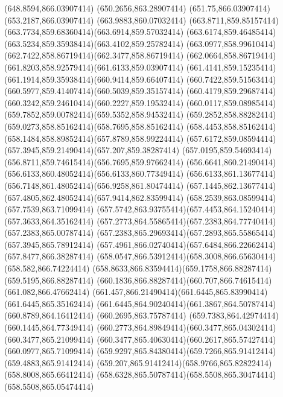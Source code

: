 {{	\lineto(648.8594,866.03907414)
	\lineto(650.2656,863.28907414)
	\lineto(651.75,866.03907414)
	\lineto(653.2187,866.03907414)
	\closepath
	\moveto(663.9883,860.07032414)
	\curveto(663.8711,859.85157414)(663.7734,859.68360414)(663.6914,859.57032414)
	\curveto(663.6174,859.46485414)(663.5234,859.35938414)(663.4102,859.25782414)
	\curveto(663.0977,858.99610414)(662.7422,858.86719414)(662.3477,858.86719414)
	\curveto(662.0664,858.86719414)(661.8203,858.92579414)(661.6133,859.03907414)
	\curveto(661.4141,859.15235414)(661.1914,859.35938414)(660.9414,859.66407414)
	\curveto(660.7422,859.51563414)(660.5977,859.41407414)(660.5039,859.35157414)
	\curveto(660.4179,859.29687414)(660.3242,859.24610414)(660.2227,859.19532414)
	\curveto(660.0117,859.08985414)(659.7852,859.00782414)(659.5352,858.94532414)
	\curveto(659.2852,858.88282414)(659.0273,858.85162414)(658.7695,858.85162414)
	\curveto(658.4453,858.85162414)(658.1484,858.89852414)(657.8789,858.99224414)
	\curveto(657.6172,859.08594414)(657.3945,859.21490414)(657.207,859.38287414)
	\curveto(657.0195,859.54693414)(656.8711,859.74615414)(656.7695,859.97662414)
	\curveto(656.6641,860.21490414)(656.6133,860.48052414)(656.6133,860.77349414)
	\curveto(656.6133,861.13677414)(656.7148,861.48052414)(656.9258,861.80474414)
	\curveto(657.1445,862.13677414)(657.4805,862.48052414)(657.9414,862.83599414)
	\lineto(658.2539,863.08599414)
	\lineto(657.7539,863.71099414)
	\curveto(657.5742,863.93755414)(657.4453,864.15240414)(657.3633,864.35162414)
	\curveto(657.2773,864.55865414)(657.2383,864.77740414)(657.2383,865.00787414)
	\curveto(657.2383,865.29693414)(657.2893,865.55865414)(657.3945,865.78912414)
	\curveto(657.4961,866.02740414)(657.6484,866.22662414)(657.8477,866.38287414)
	\curveto(658.0547,866.53912414)(658.3008,866.65630414)(658.582,866.74224414)
	\curveto(658.8633,866.83594414)(659.1758,866.88287414)(659.5195,866.88287414)
	\curveto(660.1836,866.88287414)(660.707,866.74615414)(661.082,866.47662414)
	\curveto(661.457,866.21490414)(661.6445,865.83990414)(661.6445,865.35162414)
	\curveto(661.6445,864.90240414)(661.3867,864.50787414)(660.8789,864.16412414)
	\lineto(660.2695,863.75787414)
	\lineto(659.7383,864.42974414)
	\lineto(660.1445,864.77349414)
	\curveto(660.2773,864.89849414)(660.3477,865.04302414)(660.3477,865.21099414)
	\curveto(660.3477,865.40630414)(660.2617,865.57427414)(660.0977,865.71099414)
	\curveto(659.9297,865.84380414)(659.7266,865.91412414)(659.4883,865.91412414)
	\curveto(659.207,865.91412414)(658.9766,865.82822414)(658.8008,865.66412414)
	\curveto(658.6328,865.50787414)(658.5508,865.30474414)(658.5508,865.05474414)
}}
